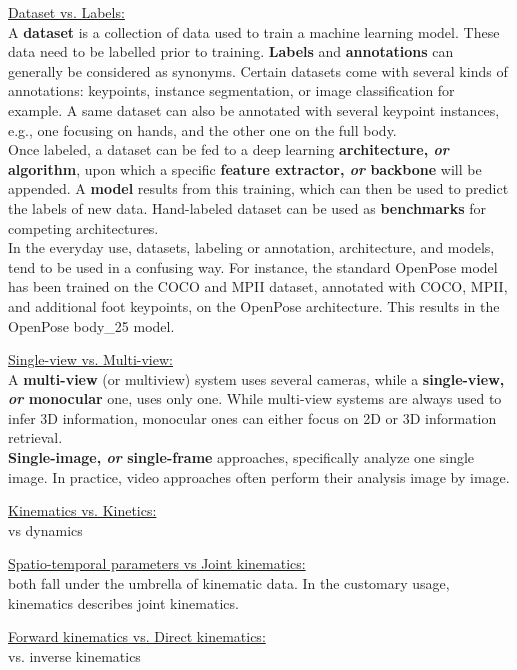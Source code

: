 \noindent\underline{Dataset vs. Labels: }\\
A \textbf{dataset} is a collection of data used to train a machine learning model. These data need to be labelled prior to training. \textbf{Labels} and \textbf{annotations} can generally be considered as synonyms. Certain datasets come with several kinds of annotations: keypoints, instance segmentation, or image classification for example. A same dataset can also be annotated with several keypoint instances, e.g., one focusing on hands, and the other one on the full body.\\
Once labeled, a dataset can be fed to a deep learning \textbf{architecture, \emph{or} algorithm}, upon which a specific \textbf{feature extractor, \emph{or} backbone} will be appended. A \textbf{model} results from this training, which can then be used to predict the labels of new data. Hand-labeled dataset can be used as \textbf{benchmarks} for competing architectures. \\
In the everyday use, datasets, labeling or annotation, architecture, and models, tend to be used in a confusing way. For instance, the standard OpenPose model has been trained on the COCO and MPII dataset, annotated with COCO, MPII, and additional foot keypoints, on the OpenPose architecture. This results in the OpenPose body\_25 model. 

\vspace*{0.5cm}

\noindent\underline{Single-view vs. Multi-view:}\\
A \textbf{multi-view} (or multiview) system uses several cameras, while a \textbf{single-view, \emph{or} monocular} one, uses only one. While multi-view systems are always used to infer 3D information, monocular ones can either focus on 2D or 3D information retrieval.\\
\textbf{Single-image, \emph{or} single-frame} approaches, specifically analyze one single image. In practice, video approaches often perform their analysis image by image.\\

\vspace*{0.5cm}

\noindent\underline{Kinematics vs. Kinetics: }\\
vs dynamics

\vspace*{0.5cm}

\noindent\underline{Spatio-temporal parameters vs Joint kinematics:}\\
both fall under the umbrella of kinematic data. In the customary usage, kinematics describes joint kinematics.

\vspace*{0.5cm}

\noindent\underline{Forward kinematics vs. Direct kinematics:}\\
vs. inverse kinematics





